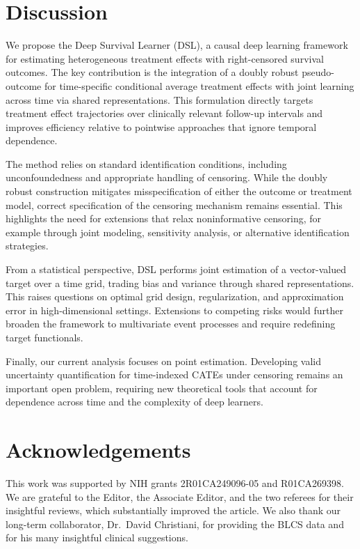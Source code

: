 \documentclass{article}
\begin{document}
\section{Discussion}

 We propose the Deep Survival Learner (DSL), a causal deep learning framework for estimating heterogeneous treatment effects with right-censored survival outcomes. The key contribution is the integration of a doubly robust pseudo-outcome for time-specific conditional average treatment effects with joint learning across time via shared representations. This formulation directly targets treatment effect trajectories over clinically relevant follow-up intervals and improves efficiency relative to pointwise approaches that ignore temporal dependence.

The method relies on standard identification conditions, including unconfoundedness and appropriate handling of censoring. While the doubly robust construction mitigates misspecification of either the outcome or treatment model, correct specification of the censoring mechanism remains essential. This highlights the need for extensions that relax noninformative censoring, for example through joint modeling, sensitivity analysis, or alternative identification strategies.

From a statistical perspective, DSL performs joint estimation of a vector-valued target over a time grid, trading bias and variance through shared representations. This raises questions on optimal grid design, regularization, and approximation error in high-dimensional settings. Extensions to competing risks would further broaden the framework to multivariate event processes and require redefining target functionals.

Finally, our current analysis focuses on point estimation. Developing valid uncertainty quantification for time-indexed CATEs under censoring remains an important open problem, requiring new theoretical tools that account for dependence across time and the complexity of deep learners.

 \section*{Acknowledgements}
This work was supported by NIH grants 2R01CA249096-05 and R01CA269398. We are grateful to the Editor, the Associate Editor, and the two referees for their insightful reviews, which substantially improved the article. We also thank our long-term collaborator, Dr.~David Christiani, for providing the BLCS data and for his many insightful clinical suggestions.
 
\end{document}
